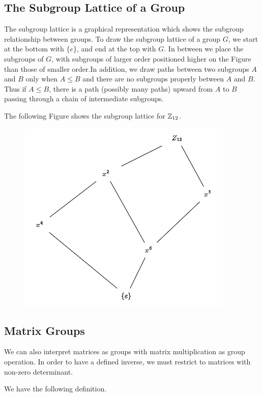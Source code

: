 \subsection{The Subgroup Lattice of a Group}

The subgroup lattice is a graphical representation which shows the subgroup relationship between groups. To draw the subgroup lattice of a group $G$, we start at the bottom with $\{e\}$, and end at the top with $G$. In between we place the subgroups of $G$, with subgroups of larger order positioned higher on the Figure than those of smaller order.In addition, we draw paths between two subgroups $A$ and $B$ only when $A \leq B$ and there are no subgroups properly between $A$ and $B$. Thus if $A \leq B$, there is a path (possibly many paths) upward from $A$ to $B$ passing through a chain of intermediate subgroups.

The following Figure shows the subgroup lattice for $\mathbb{Z}_{12}$.

\begin{figure}[H]
\centering
\includegraphics[scale=0.65]{images/2023-07-11_Z12_lattice.png}
\end{figure}

\subsection{Matrix Groups}

We can also interpret matrices as groups with matrix multiplication as group operation. In order to have a defined inverse, we must restrict to matrices with non-zero determinant.

We have the following definition.

